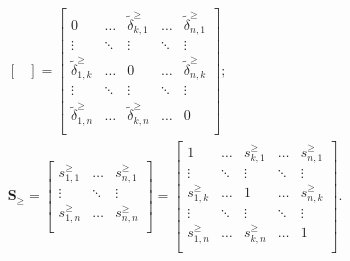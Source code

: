 \documentclass{elsarticle} %
\begin{document}
\begin{gather}
\begin{bmatrix}
    \end{bmatrix} =
    \begin{bmatrix}
        0                           & \hdots & \tilde{\delta}_{k,1}^{\geq} & \hdots & \tilde{\delta}_{n,1}^{\geq} \\
        \vdots                      & \ddots & \vdots                      & \ddots & \vdots                      \\
        \tilde{\delta}_{1,k}^{\geq} & \hdots & 0                           & \hdots & \tilde{\delta}_{n,k}^{\geq} \\
        \vdots                      & \ddots & \vdots                      & \ddots & \vdots                      \\
        \tilde{\delta}_{1,n}^{\geq} & \hdots & \tilde{\delta}_{k,n}^{\geq} & \hdots & 0                           \\
    \end{bmatrix}
    ;\\
    \textbf{S}_{\boldsymbol{\geq}} =
    \begin{bmatrix}
        s_{1,1}^{\geq} & \hdots & s_{n,1}^{\geq} \\
        \vdots         & \ddots & \vdots         \\
        s_{1,n}^{\geq} & \hdots & s_{n,n}^{\geq} \\
    \end{bmatrix} =
    \begin{bmatrix}
        1              & \hdots & s_{k,1}^{\geq} & \hdots & s_{n,1}^{\geq} \\
        \vdots         & \ddots & \vdots         & \ddots & \vdots         \\
        s_{1,k}^{\geq} & \hdots & 1              & \hdots & s_{n,k}^{\geq} \\
        \vdots         & \ddots & \vdots         & \ddots & \vdots         \\
        s_{1,n}^{\geq} & \hdots & s_{k,n}^{\geq} & \hdots & 1              \\
    \end{bmatrix}
    .
\end{gather}
\end{document}
